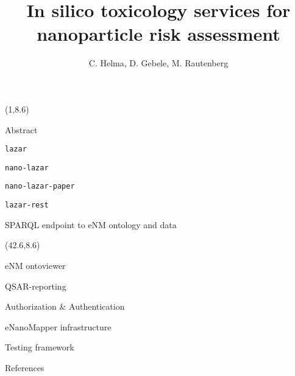\documentclass[final]{beamer}
\title{In silico toxicology services for nanoparticle risk assessment}
\author{C. Helma, D. Gebele, M. Rautenberg}
\institute{\emph{in silico} toxicology gmbh, Basel, Switzerland}
\begin{document}
  \begin{frame}{}

    \begin{textblock}{40.5}(1,8.6)
      \begin{block}{Abstract}
        
      \end{block}

      \begin{block}{\tt{lazar}}
        
      \end{block}

      \begin{block}{\tt{nano-lazar}}
        
      \end{block}

      \begin{block}{\tt{nano-lazar}-paper}
        
      \end{block}

      \begin{block}{\tt{lazar-rest}}
        
      \end{block}

      \begin{block}{SPARQL endpoint to eNM ontology and data}
        
      \end{block}

    \end{textblock}

    \begin{textblock}{40.5}(42.6,8.6)

      \begin{block}{eNM ontoviewer}
        
      \end{block}

      \begin{block}{QSAR-reporting}
        
      \end{block}

      \begin{block}{Authorization \& Authentication}
        
      \end{block}

      \begin{block}{eNanoMapper infrastructure}
        
      \end{block}

      \begin{block}{Testing framework}
        
      \end{block}

      \begin{block}{References}
        \small
      \end{block}

    \end{textblock}

  \end{frame}
\end{document}
